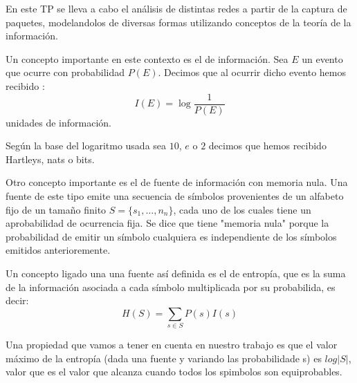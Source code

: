 En este TP se lleva a cabo el análisis de distintas redes a partir de la captura de paquetes, modelandolos de diversas formas utilizando conceptos de la teoría de la información.
 
 Un concepto importante en este contexto es el de información. Sea $E$ un evento que ocurre con probabilidad $P(E)$. Decimos que al ocurrir dicho evento hemos recibido :
 $$
 I(E) = \log{\frac{1}{P(E)}}
 $$
 unidades de información.
 
Según la base del logaritmo usada sea $10$, $e$ o $2$ decimos que hemos recibido Hartleys, nats o bits. 
 
Otro concepto importante es el de fuente de información con memoria nula. Una fuente de este tipo emite una secuencia de símbolos provenientes de un alfabeto fijo de un tamaño  finito $S = \{s_1, \dots, n_n\}$, cada uno de los cuales tiene un aprobabilidad de ocurrencia fija. Se dice que tiene "memoria nula" porque la probabilidad de emitir un símbolo cualquiera es independiente de los símbolos emitidos anterioremente.

Un concepto ligado una una fuente así definida es el de entropía, que es la suma de la información asociada a cada símbolo multiplicada por su probabilida, es decir:
$$
H(S) = \sum_{s \in S} P(s)I(s)
$$

Una propiedad que vamos a tener en cuenta en nuestro trabajo es que el valor máximo de la entropía (dada una fuente y variando las probabilidade s) es $log |S|$, valor que es el valor que alcanza cuando todos los spimbolos son equiprobables.
\blindtext
